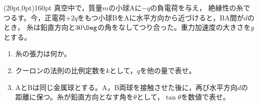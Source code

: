 \hakosyokika
\item
    \begin{mawarikomi}(20pt,0pt){160pt}{}
        真空中で，質量$m$の小球Aに$-q$の負電荷を与え，
        絶縁性の糸でつるす。今，正電荷$+2q$をもつ小球BをAに水平方向から近づけると，BA間が$d$のとき，
        糸は鉛直方向と$30\Deg $の角をなしてつり合った。重力加速度の大きさを$g$とする。
        \begin{enumerate}
            \item 糸の張力は何か。
            \item クーロンの法則の比例定数を$k$として，$q$を他の量で表せ。
            \item AとBは同じ金属球とする。A，B両球を接触させた後に，再び水平方向$d$の距離に保つ。糸が鉛直方向となす角を$\theta $として，$\tan{\theta }$を数値で表せ。
        \end{enumerate}
    \end{mawarikomi}
